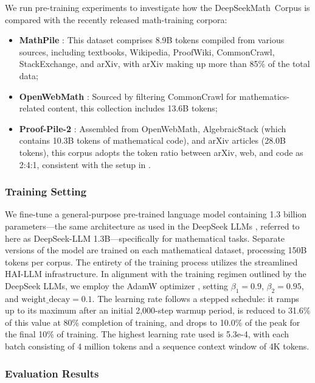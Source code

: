 \begin{itemize}[topsep=0pt]
We run pre-training experiments to investigate how the DeepSeekMath~Corpus is compared with the recently released math-training corpora:

\begin{itemize}[topsep=0pt]
    \item \textbf{MathPile} \citep{mathpile}: This dataset comprises 8.9B tokens compiled from various sources, including textbooks, Wikipedia, ProofWiki, CommonCrawl, StackExchange, and arXiv, with arXiv making up more than 85\% of the total data;
    \item \textbf{OpenWebMath} \citep{openwebmath}: Sourced by filtering CommonCrawl for mathematics-related content, this collection includes 13.6B tokens;
    \item \textbf{Proof-Pile-2} \citep{llemma}: Assembled from OpenWebMath, AlgebraicStack (which contains 10.3B tokens of mathematical code), and arXiv articles (28.0B tokens), this corpus adopts the token ratio between arXiv, web, and code as 2:4:1, consistent with the setup in \cite{llemma}.
\end{itemize}

\subsubsection{Training Setting}
\label{sec:quality-policy}
We fine-tune a general-purpose pre-trained language model containing 1.3 billion parameters—the same architecture as used in the DeepSeek LLMs \citep{deepseek-llm}, referred to here as DeepSeek-LLM 1.3B—specifically for mathematical tasks. Separate versions of the model are trained on each mathematical dataset, processing 150B tokens per corpus. The entirety of the training process utilizes the streamlined HAI-LLM \citep{haillm} infrastructure. In alignment with the training regimen outlined by the DeepSeek LLMs, we employ the AdamW optimizer \citep{adamW}, setting $\beta_1=0.9$, $\beta_2=0.95$, and $\mathrm{weight\_decay}=0.1$. The learning rate follows a stepped schedule: it ramps up to its maximum after an initial 2,000-step warmup period, is reduced to 31.6\% of this value at 80\% completion of training, and drops to 10.0\% of the peak for the final 10\% of training. The highest learning rate used is 5.3e-4, with each batch consisting of 4 million tokens and a sequence context window of 4K tokens.

\subsubsection{Evaluation Results}


\end{itemize}
